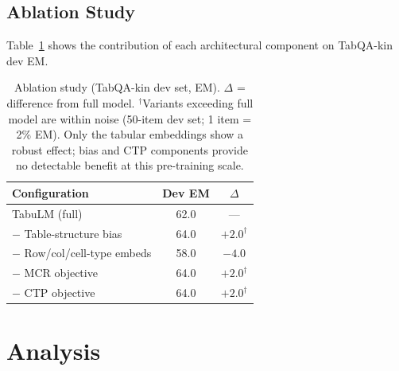 \documentclass[11pt]{article}
\begin{document}
\subsection{Ablation Study}
\label{sec:ablation}

Table~\ref{tab:ablation} shows the contribution of each architectural component on TabQA-kin dev EM.

\begin{table}[t]
\centering
\small
\begin{tabular}{lcc}
\toprule
\textbf{Configuration} & \textbf{Dev EM} & \textbf{$\Delta$} \\
\midrule
TabuLM (full)                 & 62.0   & --- \\
$-$ Table-structure bias       & 64.0   & $+2.0^\dagger$ \\
$-$ Row/col/cell-type embeds   & 58.0   & $-4.0$ \\
$-$ MCR objective              & 64.0   & $+2.0^\dagger$ \\
$-$ CTP objective              & 64.0   & $+2.0^\dagger$ \\
\bottomrule
\end{tabular}
\caption{Ablation study (TabQA-kin dev set, EM). $\Delta$ = difference from full model. $^\dagger$Variants exceeding full model are within noise (50-item dev set; 1 item = 2\% EM). Only the tabular embeddings show a robust effect; bias and CTP components provide no detectable benefit at this pre-training scale.}
\label{tab:ablation}
\end{table}

\section{Analysis}
\label{sec:analysis}
\end{document}
